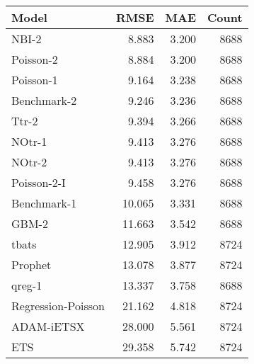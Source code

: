 \begin{tabular}{l r r r}
\toprule
Model & RMSE & MAE & Count \\
\midrule
NBI-2 & 8.883 & 3.200 & 8688 \\
Poisson-2 & 8.884 & 3.200 & 8688 \\
Poisson-1 & 9.164 & 3.238 & 8688 \\
Benchmark-2 & 9.246 & 3.236 & 8688 \\
Ttr-2 & 9.394 & 3.266 & 8688 \\
NOtr-1 & 9.413 & 3.276 & 8688 \\
NOtr-2 & 9.413 & 3.276 & 8688 \\
Poisson-2-I & 9.458 & 3.276 & 8688 \\
Benchmark-1 & 10.065 & 3.331 & 8688 \\
GBM-2 & 11.663 & 3.542 & 8688 \\
tbats & 12.905 & 3.912 & 8724 \\
Prophet & 13.078 & 3.877 & 8724 \\
qreg-1 & 13.337 & 3.758 & 8688 \\
Regression-Poisson & 21.162 & 4.818 & 8724 \\
ADAM-iETSX & 28.000 & 5.561 & 8724 \\
ETS & 29.358 & 5.742 & 8724 \\
\bottomrule
\end{tabular}
